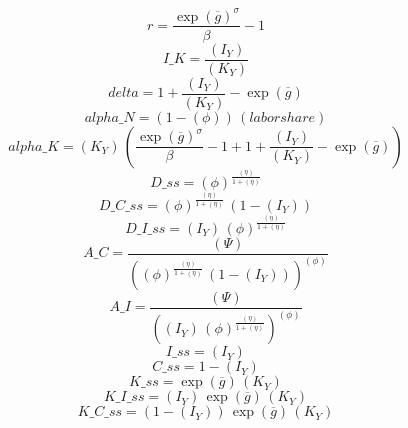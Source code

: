 \begin{dmath*}
r = \frac{\exp\left({{\overline{g}}}\right)^{{{\sigma}}}}{{{\beta}}}-1
\end{dmath*}
\begin{dmath*}
I\_K = \frac{{(I_Y)}}{{(K_Y)}}
\end{dmath*}
\begin{dmath*}
delta = 1+\frac{{(I_Y)}}{{(K_Y)}}-\exp\left({{\overline{g}}}\right)
\end{dmath*}
\begin{dmath*}
alpha\_N = \left(1-{(\phi)}\right)\, {(labor share)}
\end{dmath*}
\begin{dmath*}
alpha\_K = {(K_Y)}\, \left(\frac{\exp\left({{\overline{g}}}\right)^{{{\sigma}}}}{{{\beta}}}-1+1+\frac{{(I_Y)}}{{(K_Y)}}-\exp\left({{\overline{g}}}\right)\right)
\end{dmath*}
\begin{dmath*}
D\_ss = {(\phi)}^{\frac{{(\eta)}}{1+{(\eta)}}}
\end{dmath*}
\begin{dmath*}
D\_C\_ss = {(\phi)}^{\frac{{(\eta)}}{1+{(\eta)}}}\, \left(1-{(I_Y)}\right)
\end{dmath*}
\begin{dmath*}
D\_I\_ss = {(I_Y)}\, {(\phi)}^{\frac{{(\eta)}}{1+{(\eta)}}}
\end{dmath*}
\begin{dmath*}
A\_C = \frac{{(\Psi)}}{\left({(\phi)}^{\frac{{(\eta)}}{1+{(\eta)}}}\, \left(1-{(I_Y)}\right)\right)^{{(\phi)}}}
\end{dmath*}
\begin{dmath*}
A\_I = \frac{{(\Psi)}}{\left({(I_Y)}\, {(\phi)}^{\frac{{(\eta)}}{1+{(\eta)}}}\right)^{{(\phi)}}}
\end{dmath*}
\begin{dmath*}
I\_ss = {(I_Y)}
\end{dmath*}
\begin{dmath*}
C\_ss = 1-{(I_Y)}
\end{dmath*}
\begin{dmath*}
K\_ss = \exp\left({{\overline{g}}}\right)\, {(K_Y)}
\end{dmath*}
\begin{dmath*}
K\_I\_ss = {(I_Y)}\, \exp\left({{\overline{g}}}\right)\, {(K_Y)}
\end{dmath*}
\begin{dmath*}
K\_C\_ss = \left(1-{(I_Y)}\right)\, \exp\left({{\overline{g}}}\right)\, {(K_Y)}
\end{dmath*}
